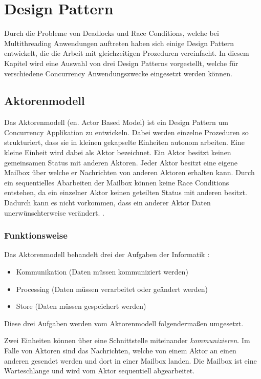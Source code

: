 \section{Design Pattern}

Durch die Probleme von Deadlocks und Race Conditions, welche bei Multithreading Anwendungen auftreten haben sich einige Design Pattern entwickelt, die die Arbeit mit gleichzeitigen Prozeduren vereinfacht. In diesem Kapitel wird eine Auswahl von drei Design Patterns vorgestellt, welche für verschiedene Concurrency Anwendungszwecke eingesetzt werden können.

\subsection{Aktorenmodell}
\label{section:Aktorenmodell}

Das Aktorenmodell (en. Actor Based Model) ist ein Design Pattern um Concurrency Applikation zu entwickeln. Dabei werden einzelne Prozeduren so strukturiert, dass sie in kleinen gekapselte Einheiten autonom arbeiten. Eine kleine Einheit wird dabei als Aktor bezeichnet. Ein Aktor besitzt keinen gemeinsamen Status mit anderen Aktoren. Jeder Aktor besitzt eine eigene Mailbox über welche er Nachrichten von anderen Aktoren erhalten kann. Durch ein sequentielles Abarbeiten der Mailbox können keine Race Conditions entstehen, da ein einzelner Aktor keinen geteilten Status mit anderen besitzt. Dadurch kann es nicht vorkommen, dass ein anderer Aktor Daten unerwünschterweise verändert.  \cite[p. 84]{Erb2012}. 

\subsubsection{Funktionsweise}

Das Aktorenmodell behandelt drei der Aufgaben der Informatik \cite[p. 85]{Erb2012}:

\begin{itemize}
  \item Kommunikation (Daten müssen kommuniziert werden)
  \item Processing (Daten müssen verarbeitet oder geändert werden)
  \item Store (Daten müssen gespeichert werden)
\end{itemize}

Diese drei Aufgaben werden vom Aktorenmodell folgendermaßen umgesetzt.

Zwei Einheiten können über eine Schnittstelle miteinander \emph{kommunizieren}. Im Falle von Aktoren sind das Nachrichten, welche von einem Aktor an einen anderen gesendet werden und dort in einer Mailbox landen. Die Mailbox ist eine Warteschlange und wird vom Aktor sequentiell abgearbeitet. 

